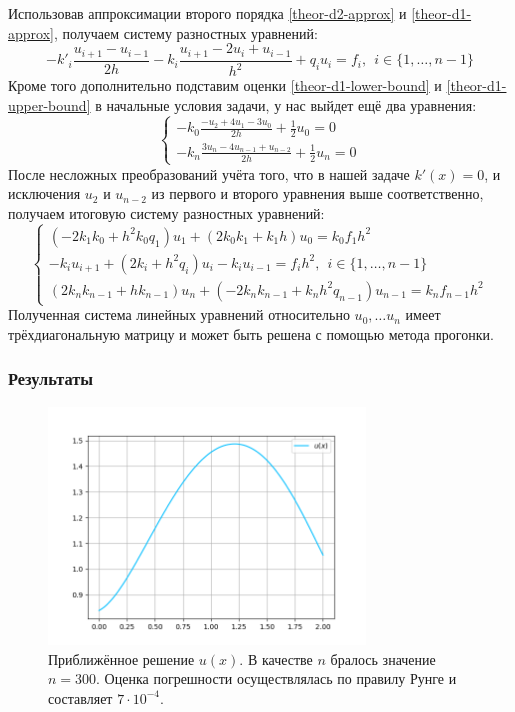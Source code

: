 \documentclass[12pt]{article}%
\begin{document}
Использовав аппроксимации второго порядка \ref{theor-d2-approx} и \ref{theor-d1-approx}, получаем систему разностных уравнений:
\begin{equation*}
    -k'_i \frac{u_{i+1} - u_{i-1}}{2h} - 
    k_i \frac{u_{i+1} - 2u_i + u_{i-1}}{h^2} + q_i u_i = f_i,\ \
    i \in \{1,\dots, n-1\}
\end{equation*}
Кроме того дополнительно подставим оценки \ref{theor-d1-lower-bound} и \ref{theor-d1-upper-bound} в начальные условия задачи, у нас выйдет ещё два уравнения:
\begin{equation*}
\begin{cases}
    -k_0 \frac{-u_2 + 4u_1 - 3u_0}{2h} + \frac{1}{2} u_0 = 0 \\
    -k_n \frac{3 u_n - 4u_{n-1} + u_{n-2}}{2h} + \frac{1}{2} u_n = 0
\end{cases}
\end{equation*}
После несложных преобразований учёта того, что в нашей задаче $k'(x) = 0$, и исключения $u_2$ и $u_{n-2}$ из первого и второго уравнения выше соответственно, получаем итоговую систему разностных уравнений:
\begin{equation*}
\begin{cases}
(-2 k_1 k_0 + h^2 k_0 q_1)u_1 + (2 k_0 k_1 + k_1 h)u_0 = k_0 f_1 h^2 \\
-k_i u_{i+1} + (2k_i + h^2 q_i) u_i - k_i u_{i-1} = f_i h^2,\ \ i \in \{1, \dots, n-1 \}\\
(2 k_n k_{n-1} + h k_{n-1})u_n + (-2k_n k_{n-1} + k_n h^2 q_{n-1})u_{n-1} = k_n f_{n-1} h^2
\end{cases}
\end{equation*}
Полученная система линейных уравнений относительно $u_0, \dots u_n$ имеет трёхдиагональную матрицу и может быть решена с помощью метода прогонки.

\subsubsection{Результаты}
\begin{figure}[H]
    \centering
    \includegraphics[width=0.75\textwidth]{problem5.png}
    \caption{Приближённое решение $u(x)$. В качестве $n$ бралось значение $n=300$. Оценка погрешности осуществлялась по правилу Рунге и составляет $7\cdot 10^{-4}$.}
\end{figure}
\end{document}
